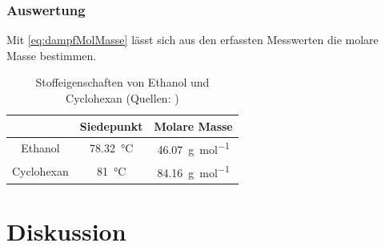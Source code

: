 \subsubsection{Auswertung}

Mit \eqref{eq:dampfMolMasse} lässt sich aus den erfassten Messwerten die molare Masse bestimmen. 

\begin{table}[H]
\centering
\begin{tabular} {c|c|c}
	 & Siedepunkt & Molare Masse \\\hline
	Ethanol & \SI{78,32}{\degreeCelsius} & \SI{46,07}{\g\per\mol} \\
	Cyclohexan & \SI{81}{\degreeCelsius} & \SI{84,16}{ \g\per\mol}
\end{tabular}
\caption{Stoffeigenschaften von Ethanol und Cyclohexan (Quellen: \cite{wiki:ethanol,wiki:cyclohexan})}
\label{tab:propEthanolCyclo}
\end{table} 


\section{Diskussion} %